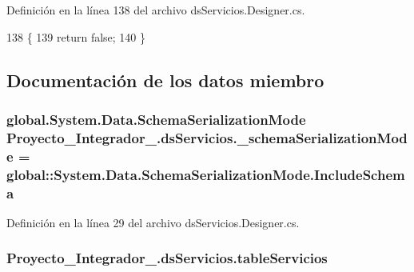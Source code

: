 Definición en la línea 138 del archivo ds\-Servicios.\-Designer.\-cs.


\begin{DoxyCode}
138                                                         \{
139             \textcolor{keywordflow}{return} \textcolor{keyword}{false};
140         \}
\end{DoxyCode}


\subsection{Documentación de los datos miembro}
\hypertarget{class_proyecto___integrador__3_1_1ds_servicios_aa24e53512ea217f603268b7dcc69c0cf}{
\subsubsection[{\-\_\-schema\-Serialization\-Mode}]{\setlength{\rightskip}{0pt plus 5cm}global.\-System.\-Data.\-Schema\-Serialization\-Mode Proyecto\-\_\-\-Integrador\-\_.\-ds\-Servicios.\-\_\-schema\-Serialization\-Mode = global\-::\-System.\-Data.\-Schema\-Serialization\-Mode.\-Include\-Schema\hspace{0.3cm}{\ttfamily [private]}}}\label{class_proyecto___integrador__3_1_1ds_servicios_aa24e53512ea217f603268b7dcc69c0cf}


Definición en la línea 29 del archivo ds\-Servicios.\-Designer.\-cs.

\hypertarget{class_proyecto___integrador__3_1_1ds_servicios_a68ae0be2da362f71e5b2623b4ceb7380}{
\subsubsection[{table\-Servicios}]{ Proyecto\-\_\-\-Integrador\-\_.\-ds\-Servicios.\-table\-Servicios\hspace{0.3cm}{\ttfamily [private]}}}\label{class_proyecto___integrador__3_1_1ds_servicios_a68ae0be2da362f71e5b2623b4ceb7380}


